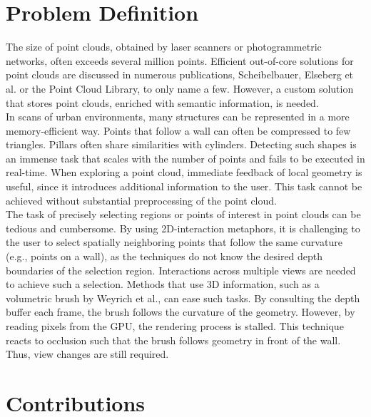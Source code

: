 \section{Problem Definition}

The size of point clouds, obtained by laser scanners or photogrammetric networks, often exceeds several million points. 
Efficient out-of-core solutions for point clouds are discussed in numerous publications, Scheibelbauer\cite{scheiblauer-thesis}, Elseberg et al.\cite{elseberg2013one} or the Point Cloud Library\cite{rusu20113d}, to only name a few. However, a custom solution that stores point clouds, enriched with semantic information, is needed.
\\
In scans of urban environments, many structures can be represented in a more memory-efficient way. Points that follow a wall can often be compressed to few triangles. Pillars often share similarities with cylinders. Detecting such shapes is an immense task that scales with the number of points and fails to be executed in real-time. When exploring a point cloud, immediate feedback of local geometry is useful, since it introduces additional information to the user. This task cannot be achieved without substantial preprocessing of the point cloud. 
\\
The task of precisely selecting regions or points of interest in point clouds can be tedious and cumbersome. By using 2D-interaction metaphors, it is challenging to the user to select spatially neighboring points that follow the same curvature (e.g., points on a wall), as the techniques do not know the desired depth boundaries of the selection region. Interactions across multiple views are needed to achieve such a selection.  Methods that use 3D information, such as a volumetric brush by Weyrich et al.\cite{weyrich2004post}, can ease such tasks. By consulting the depth buffer each frame, the brush follows the curvature of the geometry. However, by reading pixels from the GPU, the rendering process is stalled. This technique reacts to occlusion such that the brush follows geometry in front of the wall. Thus, view changes are still required.


\section{Contributions}

